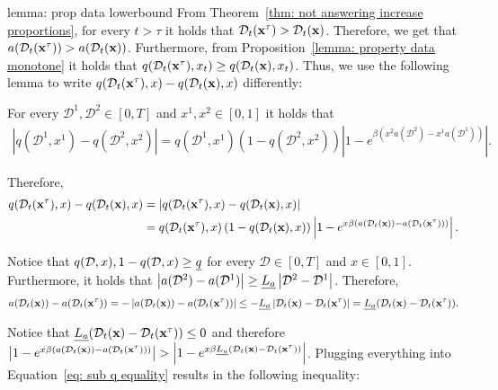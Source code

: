 \begin{proofof}{lemma: prop data lowerbound}
From Theorem~\ref{thm: not answering increase proportions}, for every $t > \tau$ it holds that $\mathcal{D}_t({\bf{x}}^\tau) > \mathcal{D}_t({\bf{x}})$. Therefore, we get that $a(\mathcal{D}_t({\bf{x}}^\tau)) > a(\mathcal{D}_t({\bf{x}}))$. Furthermore, from Proposition~\ref{lemma: property data monotone} it holds that $q(\mathcal{D}_t({\bf{x}}^\tau), x_t) \geq q(\mathcal{D}_t({\bf{x}}), x_t)$. Thus, we use the following lemma to write $q(\mathcal{D}_t({\bf{x}}^\tau), x) - q(\mathcal{D}_t({\bf{x}}), x)$ differently:
\begin{lemma} \label{lemma: q equality}
For every $\mathcal{D}^1, \mathcal{D}^2 \in [0, T]$ and $x^1, x^2 \in [0, 1]$ it holds that
\begin{align*}
\left| q(\mathcal{D}^1, x^1) - q(\mathcal{D}^2, x^2) \right| = q(\mathcal{D}^1, x^1) \left(1-q(\mathcal{D}^2, x^2)\right) \left| 1 - e^{\beta \left(x^2 a(\mathcal{D}^2) - x^1 a(\mathcal{D}^1) \right)} \right|.
\end{align*}
\end{lemma}

Therefore,
\begin{align}
q(\mathcal{D}_t({\bf{x}}^\tau), x) - q(\mathcal{D}_t({\bf{x}}), x) &= \left| q(\mathcal{D}_t({\bf{x}}^\tau), x) - q(\mathcal{D}_t({\bf{x}}), x) \right| \label{eq: sub q equality} \\
\nonumber &= q(\mathcal{D}_t({\bf{x}}^\tau), x) \left(1-q(\mathcal{D}_t({\bf{x}}), x)\right) \left| 1 - e^{x \beta \left( a(\mathcal{D}_t({\bf{x}})) - a(\mathcal{D}_t({\bf{x}}^\tau)) \right)} \right|.
\end{align}

Notice that $q(\mathcal{D}, x), 1-q(\mathcal{D}, x) \geq \underline{q}$ for every $\mathcal{D} \in [0, T]$ and $x \in [0, 1]$. Furthermore, it holds that $\left| a(\mathcal{D}^2) - a(\mathcal{D}^1) \right| \geq \underline{L_a} \left| \mathcal{D}^2 - \mathcal{D}^1 \right|$. Therefore,
\begin{align*}
a(\mathcal{D}_t({\bf{x}})) - a(\mathcal{D}_t({\bf{x}}^\tau)) = -\left| a(\mathcal{D}_t({\bf{x}})) - a(\mathcal{D}_t({\bf{x}}^\tau)) \right| \leq -\underline{L_a} \left| \mathcal{D}_t({\bf{x}}) - \mathcal{D}_t({\bf{x}}^\tau) \right| = \underline{L_a} (\mathcal{D}_t({\bf{x}}) - \mathcal{D}_t({\bf{x}}^\tau)).
\end{align*}

Notice that $\underline{L_a} (\mathcal{D}_t({\bf{x}}) - \mathcal{D}_t({\bf{x}}^\tau)) \leq 0$ and therefore $\left| 1 - e^{x \beta \left( a(\mathcal{D}_t({\bf{x}})) - a(\mathcal{D}_t({\bf{x}}^\tau)) \right)} \right| > \left| 1 - e^{x \beta \underline{L_a} \left(\mathcal{D}_t({\bf{x}}) - \mathcal{D}_t({\bf{x}}^\tau) \right)} \right|$.
Plugging everything into Equation~\eqref{eq: sub q equality} results in the following inequality:


\end{proofof}
